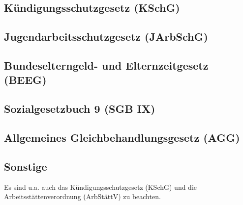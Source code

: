 \subsection{Kündigungsschutzgesetz (KSchG)}

\subsection{Jugendarbeitsschutzgesetz (JArbSchG)}

\subsection{Bundeselterngeld- und Elternzeitgesetz (BEEG)}

\subsection{Sozialgesetzbuch 9 (SGB IX)}

\subsection{Allgemeines Gleichbehandlungsgesetz (AGG)}

\subsection{Sonstige}

Es sind u.a. auch das Kündigungsschutzgesetz (KSchG) und die Arbeitsstättenverordnung (ArbStättV) zu beachten.